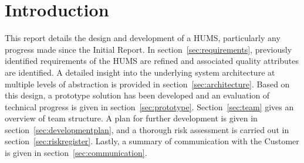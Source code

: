 \section{Introduction}
\label{sec:introduction}

This report details the design and development of a HUMS, particularly any progress made since the Initial Report. In section~\ref{sec:requirements}, previously identified requirements of the HUMS are refined and associated quality attributes are identified. A detailed insight into the underlying system architecture at multiple levels of abstraction is provided in section~\ref{sec:architecture}. Based on this design, a prototype solution has been developed and an evaluation of technical progress is given in section~\ref{sec:prototype}. Section~\ref{sec:team} gives an overview of team structure. A plan for further development is given in section~\ref{sec:developmentplan}, and a thorough risk assessment is carried out in section~\ref{sec:riskregister}. Lastly, a summary of communication with the Customer is given in section~\ref{sec:communication}.
